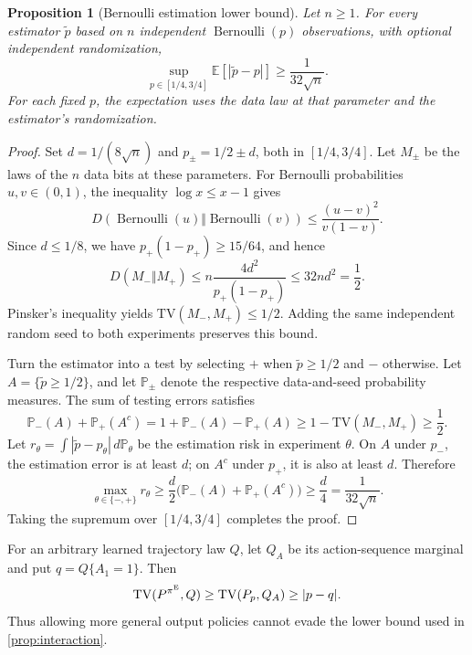 \documentclass[11pt,twoside]{article}
\newcommand{\E}{\mathbb E}
\renewcommand{\P}{\mathbb P}
\newcommand{\KL}{D}
\newcommand{\TV}{\mathrm{TV}}
\newtheorem{proposition}[theorem]{Proposition}
\theoremstyle{definition}
\theoremstyle{remark}
\begin{document}
\begin{proposition}[Bernoulli estimation lower bound]
\label{prop:bernoulli-lower}
Let $n\ge1$. For every estimator $\widetilde p$ based on $n$ independent
$\operatorname{Bernoulli}(p)$ observations, with optional independent
randomization,
\[
 \sup_{p\in[1/4,3/4]}\E[|\widetilde p-p|]\ge\frac1{32\sqrt n}.
\]
For each fixed $p$, the expectation uses the data law at that parameter
and the estimator's randomization.
\end{proposition}

\begin{proof}
Set $d=1/(8\sqrt n)$ and $p_\pm=1/2\pm d$, both in $[1/4,3/4]$.
Let $M_\pm$ be the laws of the $n$ data bits at these parameters.
For Bernoulli probabilities $u,v\in(0,1)$, the inequality
$\log x\le x-1$ gives
\[
 \KL(\operatorname{Bernoulli}(u)\Vert\operatorname{Bernoulli}(v))
 \le\frac{(u-v)^2}{v(1-v)}.
\]
Since $d\le1/8$, we have $p_+(1-p_+)\ge15/64$, and hence
\[
 \KL(M_-\Vert M_+)
 \le n\frac{4d^2}{p_+(1-p_+)}
 \le32nd^2=\frac12.
\]
Pinsker's inequality yields $\TV(M_-,M_+)\le1/2$.
Adding the same independent random seed to both experiments preserves
this bound.

Turn the estimator into a test by selecting $+$ when
$\widetilde p\ge1/2$ and $-$ otherwise. Let
$A=\{\widetilde p\ge1/2\}$, and let $\P_\pm$ denote the respective
data-and-seed probability measures. The sum of testing errors satisfies
\[
 \P_-(A)+\P_+(A^c)
 =1+\P_-(A)-\P_+(A)
 \ge1-\TV(M_-,M_+)\ge\frac12.
\]
Let $r_\theta=\int|\widetilde p-p_\theta|\,d\P_\theta$ be the estimation
risk in experiment $\theta$. On $A$ under $p_-$, the estimation error
is at least $d$; on $A^c$ under $p_+$, it is also at least $d$. Therefore
\[
 \max_{\theta\in\{-,+\}}r_\theta
 \ge\frac d2\bigl(\P_-(A)+\P_+(A^c)\bigr)
 \ge\frac d4=\frac1{32\sqrt n}.
\]
Taking the supremum over $[1/4,3/4]$ completes the proof.
\end{proof}

For an arbitrary learned trajectory law $Q$, let $Q_A$ be its
action-sequence marginal and put $q=Q\{A_1=1\}$. Then
\[
 \TV(P^{\pi^{\rm E}},Q)\ge\TV(P_p,Q_A)\ge|p-q|.
\]
Thus allowing more general output policies cannot evade the lower bound
used in \cref{prop:interaction}.
\end{document}

